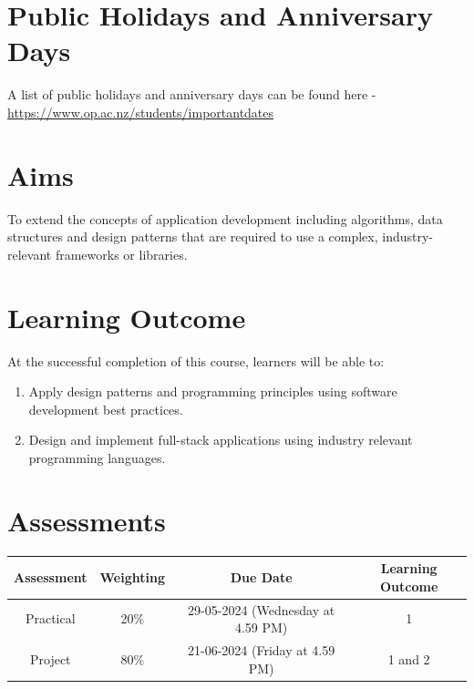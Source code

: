 \documentclass{article}
\begin{document}
\section*{Public Holidays and Anniversary Days}
A list of public holidays and anniversary days can be found here - \href{https://www.op.ac.nz/students/importantdates}{https://www.op.ac.nz/students/importantdates}

\section*{Aims}
To extend the concepts of application development including algorithms, data structures and design patterns that are required to use a complex, industry-relevant frameworks or libraries.

\section*{Learning Outcome}
At the successful completion of this course, learners will be able to:
\begin{enumerate}
	\item Apply design patterns and programming principles using software development best practices.
	\item Design and implement full-stack applications using industry relevant programming languages.
\end{enumerate}

\section*{Assessments}
\renewcommand{\arraystretch}{1.5}
\begin{tabular}{|c|c|c|c|}
	\hline
	\textbf{Assessment}                                 & \textbf{Weighting} & \textbf{Due Date}            & \textbf{Learning Outcome} \\ \hline
	\small Practical & \small 20\%        & \small 29-05-2024 (Wednesday at 4.59 PM)   & \small 1                   \\ \hline
	\small Project                 & \small 80\%        & \small 21-06-2024 (Friday at 4.59 PM) \small  & \small 1 and 2                   \\ \hline
\end{tabular}
\end{document}
